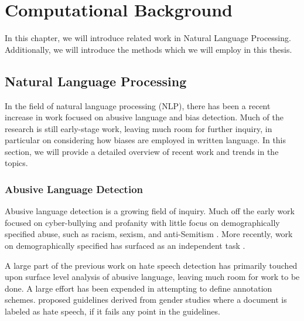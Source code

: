\chapter{Computational Background}\label{chap:nlp}

\ifpdf
    \graphicspath{{Chapter3/Figs/Raster/}{Chapter3/Figs/PDF/}{Chapter3/Figs/}}
\else
    \graphicspath{{Chapter3/Figs/Vector/}{Chapter3/Figs/}}
\fi
In this chapter, we will introduce related work in Natural Language Processing. Additionally, we will introduce the methods which we will employ in this thesis.


\section{Natural Language Processing}
In the field of natural language processing (NLP), there has been a recent increase in work focused on abusive language and bias detection. Much of the research is still early-stage work, leaving much room for further inquiry, in particular on considering how biases are employed in written language. In this section, we will provide a detailed overview of recent work and trends in the topics.

\subsection{Abusive Language Detection}
Abusive language detection is a growing field of inquiry. Much off the early work focused on cyber-bullying \citep{Chen:2012,Cho:2013,Reynolds:2011} and profanity \citep{Sood:profanity:2012,Sood:2013} with little focus on demographically specified abuse, such as racism, sexism, and anti-Semitism \citep{Warner:2012}. More recently, work on demographically specified has surfaced as an independent task \citep{Waseem:2016,Waseem-Hovy:2016,Davidson:2017,Tulkens:2015,Agarwal:2016,Silva:2016,Park:2017,Samghabadi:2017}.

A large part of the previous work on hate speech detection has primarily touched upon surface level analysis of abusive language, leaving much room for work to be done. A large effort has been expended in attempting to define annotation schemes. \cite{Waseem-Hovy:2016} proposed guidelines derived from gender studies \citep{McIntosh:1988} where a document is labeled as hate speech, if it fails any point in the guidelines. 

